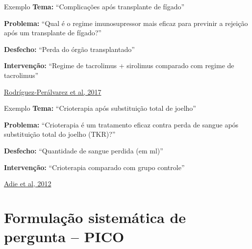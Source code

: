 \documentclass{beamer}
\begin{document}
\begin{frame}
  \begin{exampleblock}{Exemplo}
    \tiny
    {\bf Tema: }``Complicações após transplante de fígado''

    \bigskip
    {\bf Problema:} ``Qual é o regime imunosupressor mais eficaz para previnir a rejeição após um transplante de fígado?''

    \bigskip
    {\bf Desfecho:} ``Perda do órgão transplantado''

    \bigskip
    \normalsize
    {\bf Intervenção:} ``Regime de tacrolimus + sirolimus comparado com regime de tacrolimus''
  \end{exampleblock}

  \vfill
  \scriptsize
  \hfill \href{https://doi.org/10.1002/14651858.cd011639.pub2}{Rodríguez‐Perálvarez et al, 2017}
\end{frame}

\begin{frame}
  \begin{exampleblock}{Exemplo}
    \tiny
    {\bf Tema: }``Crioterapia após substituição total de joelho''

    \bigskip
    {\bf Problema:} ``Crioterapia é um tratamento eficaz contra perda de sangue após substituição total do joelho (TKR)?''

    \bigskip
    {\bf Desfecho:} ``Quantidade de sangue perdida (em ml)''

    \bigskip
    \normalsize
    {\bf Intervenção:} ``Crioterapia comparado com grupo controle''
\end{exampleblock}

  \vfill
  \scriptsize
  \hfill \href{https://doi.org/10.1002/14651858.CD007911.pub2}{Adie et al, 2012}
\end{frame}

\section{Formulação sistemática de pergunta -- PICO}
\end{document}
